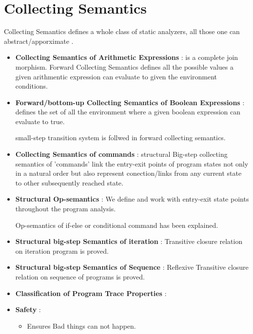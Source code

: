 \chapter{Collecting Semantics}

Collecting Semantics defines a whole class of static analyzers, all those one can abstract/apporximate .

\begin{itemize}
	\item{\textbf{Collecting Semantics of Arithmetic Expressions} : is a complete join morphism. Forward Collecting Semantics defines all the possible values a given arithmentic expression can evaluate to given the environment conditions.
	}

	\item{\textbf{Forward/bottom-up Collecting Semantics of Boolean Expressions} :
	defines the set of all the environment where a given boolean expression can evaluate to true.

	small-step transition system is follwed in forward collecting semantics.
	}

	\item{\textbf{Collecting Semantics of commands} : structural Big-step collecting semantics of 'commands' link the entry-exit points of program states not only in a natural order but also represent conection/links from any current state to other subsequently reached state.
	}

	\item{\textbf{Structural Op-semantics} : We define and work with entry-exit state points throughout the program analysis. 

	Op-semantics of if-else or conditional command has been explained.
	}

	\item{\textbf{Structural big-step Semantics of iteration} :
	Transitive closure relation on iteration program is proved.
	}

	\item{\textbf{Structural big-step Semantics of Sequence} :
	Reflexive Transitive closure relation on sequence of programs is proved.
	}

	\item{\textbf{Classification of Program Trace Properties} :

	}

	\item{\textbf{Safety} :
		\begin{itemize}
			\item{Ensures Bad things can not happen.
			}


\end{itemize}}
\end{itemize}
